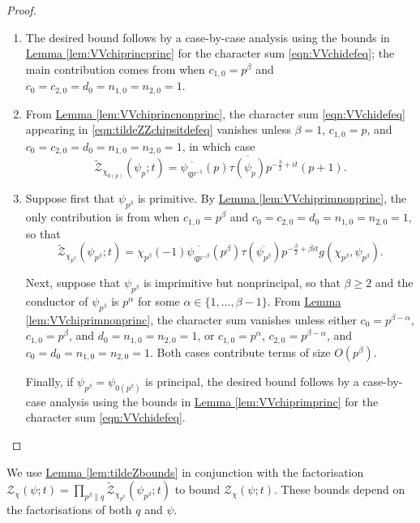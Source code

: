 \documentclass[11pt,a4paper]{amsart}
\newcommand{\ZZ}{\mathcal{Z}}
\numberwithin{equation}{section}
\theoremstyle{remark}
\theoremstyle{definition}
\begin{document}
\begin{proof}\hspace{1em}

\begin{enumerate}[leftmargin=*,label=\textup{(\arabic*)}]
\item The desired bound follows by a case-by-case analysis using the bounds in \hyperref[lem:VVchiprincprinc]{Lemma \ref*{lem:VVchiprincprinc}} for the character sum \eqref{eqn:VVchidefeq}; the main contribution comes from when $c_{1,0} = p^{\beta}$ and $c_0 = c_{2,0} = d_0 = n_{1,0} = n_{2,0} = 1$.
\item From \hyperref[lem:VVchiprincnonprinc]{Lemma \ref*{lem:VVchiprincnonprinc}}, the character sum \eqref{eqn:VVchidefeq} appearing in \eqref{eqn:tildeZZchipsitdefeq} vanishes unless $\beta = 1$, $c_{1,0} = p$, and $c_0 = c_{2,0} = d_0 = n_{1,0} = n_{2,0} = 1$, in which case
\[\widetilde{\ZZ}_{\chi_{0(p)}}(\psi_p;t) = \overline{\psi_{qp^{-1}}}(p) \overline{\tau(\psi_p)} p^{-\frac{3}{2} + it} (p + 1).\]
\item Suppose first that $\psi_{p^{\beta}}$ is primitive. By \hyperref[lem:VVchiprimnonprinc]{Lemma \ref*{lem:VVchiprimnonprinc}}, the only contribution is from when $c_{1,0} = p^{\beta}$ and $c_0 = c_{2,0} = d_0 = n_{1,0} = n_{2,0} = 1$, so that
\[\widetilde{\ZZ}_{\chi_{p^{\beta}}}(\psi_{p^{\beta}};t) = \chi_{p^{\beta}}(-1) \overline{\psi_{qp^{-\beta}}}(p^{\beta}) \tau(\overline{\psi_{p^{\beta}}}) p^{-\frac{\beta}{2} + \beta it} g(\chi_{p^{\beta}},\psi_{p^{\beta}}).\]

Next, suppose that $\psi_{p^{\beta}}$ is imprimitive but nonprincipal, so that $\beta \geq 2$ and the conductor of $\psi_{p^{\beta}}$ is $p^{\alpha}$ for some $\alpha \in \{1,\ldots,\beta - 1\}$. From \hyperref[lem:VVchiprimnonprinc]{Lemma \ref*{lem:VVchiprimnonprinc}}, the character sum vanishes unless either $c_0 = p^{\beta - \alpha}$, $c_{1,0} = p^{\beta}$, and $d_0 = n_{1,0} = n_{2,0} = 1$, or $c_{1,0} = p^{\alpha}$, $c_{2,0} = p^{\beta - \alpha}$, and $c_0 = d_0 = n_{1,0} = n_{2,0} = 1$. Both cases contribute terms of size $O(p^{\beta})$.

Finally, if $\psi_{p^{\beta}} = \psi_{0(p^{\beta})}$ is principal, the desired bound follows by a case-by-case analysis using the bounds in \hyperref[lem:VVchiprimprinc]{Lemma \ref*{lem:VVchiprimprinc}} for the character sum \eqref{eqn:VVchidefeq}.
\qedhere
\end{enumerate}
\end{proof}

We use \hyperref[lem:tildeZbounds]{Lemma \ref*{lem:tildeZbounds}} in conjunction with the factorisation $\ZZ_{\chi}(\psi;t) = \prod_{p^{\beta} \parallel q} \widetilde{\ZZ}_{\chi_{p^{\beta}}}(\psi_{p^{\beta}};t)$ to bound $\ZZ_{\chi}(\psi;t)$. These bounds depend on the factorisations of both $q$ and $\psi$.
\end{document}
